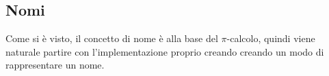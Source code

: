 \subsection{Nomi}

Come si \`e visto, il concetto di nome \`e alla base del $\pi$-calcolo,
quindi viene naturale partire con l'implementazione proprio creando creando
un modo di rappresentare un nome.




